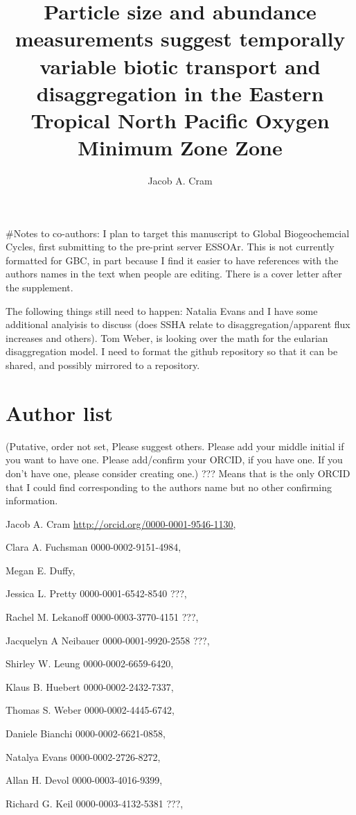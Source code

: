 \documentclass[]{article}
\title{Particle size and abundance measurements suggest temporally variable
biotic transport and disaggregation in the Eastern Tropical North
Pacific Oxygen Minimum Zone Zone}
\author{Jacob A. Cram}
\date{}
\begin{document}
\maketitle

\#Notes to co-authors: I plan to target this manuscript to Global
Biogeochemcial Cycles, first submitting to the pre-print server ESSOAr.
This is not currently formatted for GBC, in part because I find it
easier to have references with the authors names in the text when people
are editing. There is a cover letter after the supplement.

The following things still need to happen: Natalia Evans and I have some
additional analyisis to discuss (does SSHA relate to
disaggregation/apparent flux increases and others). Tom Weber, is
looking over the math for the eularian disaggregation model. I need to
format the github repository so that it can be shared, and possibly
mirrored to a repository.

\hypertarget{author-list}{%
\section{Author list}\label{author-list}}

(Putative, order not set, Please suggest others. Please add your middle
initial if you want to have one. Please add/confirm your ORCID, if you
have one. If you don't have one, please consider creating one.) ???
Means that is the only ORCID that I could find corresponding to the
authors name but no other confirming information.

Jacob A. Cram \url{http://orcid.org/0000-0001-9546-1130},

Clara A. Fuchsman 0000-0002-9151-4984,

Megan E. Duffy,

Jessica L. Pretty 0000-0001-6542-8540 ???,

Rachel M. Lekanoff 0000-0003-3770-4151 ???,

Jacquelyn A Neibauer 0000-0001-9920-2558 ???,

Shirley W. Leung 0000-0002-6659-6420,

Klaus B. Huebert 0000-0002-2432-7337,

Thomas S. Weber 0000-0002-4445-6742,

Daniele Bianchi 0000-0002-6621-0858,

Natalya Evans 0000-0002-2726-8272,

Allan H. Devol 0000-0003-4016-9399,

Richard G. Keil 0000-0003-4132-5381 ???,
\end{document}
